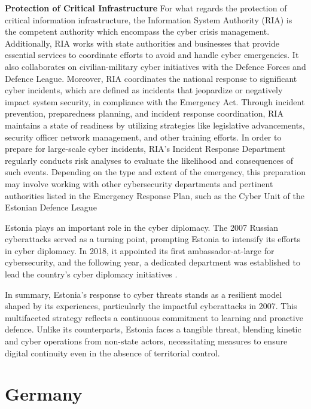 \textbf{Protection of Critical Infrastructure} For what regards the protection of critical information infrastructure, the Information System Authority (RIA) is the competent authority which encompass the cyber crisis management. Additionally, RIA works with state authorities and businesses that provide essential services to coordinate efforts to avoid and handle cyber emergencies. It also collaborates on civilian-military cyber initiatives with the Defence Forces and Defence League. Moreover, RIA coordinates the national response to significant cyber incidents, which are defined as incidents that jeopardize or negatively impact system security, in compliance with the Emergency Act. Through incident prevention, preparedness planning, and incident response coordination, RIA maintains a state of readiness by utilizing strategies like legislative advancements, security officer network management, and other training efforts. In order to prepare for large-scale cyber incidents, RIA's Incident Response Department regularly conducts risk analyses to evaluate the likelihood and consequences of such events. Depending on the type and extent of the emergency, this preparation may involve working with other cybersecurity departments and pertinent authorities listed in the Emergency Response Plan, such as the Cyber Unit of the Estonian Defence League \autocite{informationsystemauthority_2022_cyber}

Estonia plays an important role in the cyber diplomacy. The 2007 Russian cyberattacks served as a turning point, prompting Estonia to intensify its efforts in cyber diplomacy. In 2018, it appointed its first ambassador-at-large for cybersecurity, and the following year, a dedicated department was established to lead the country's cyber diplomacy initiatives \autocite{theinternationalinstituteforstrategicstudies_2023_cyber}.  



In summary, Estonia's response to cyber threats stands as a resilient model shaped by its experiences, particularly the impactful cyberattacks in 2007. This multifaceted strategy reflects a continuous commitment to learning and proactive defence. Unlike its counterparts, Estonia faces a tangible threat, blending kinetic and cyber operations from non-state actors, necessitating measures to ensure digital continuity even in the absence of territorial control.

\section{Germany}

